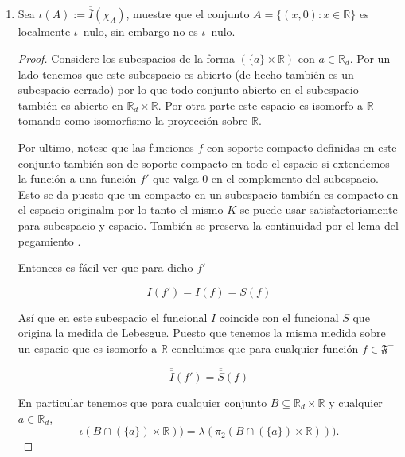 \documentclass[letter,twoside,12pt]{article}
\numberwithin{equation}{section}
\begin{document}
\begin{enumerate}[label = (\textbf{\arabic*.})]
\begin{enumerate}[label = (\textbf{\roman*.})]
\begin{proof}
Luego
\begin{eqnarray*} 
I(\alpha f+\beta g) &=& S(\sum_{i=1}^n \alpha f_{[x]} + \beta g_{[x]}) = S(\alpha\sum_{i=1}^n f_{[x]} + \beta \sum_{i=1}^n g_{[x]})
\\ &=& \alpha S(\sum_{i=1}^n f_{[x]}) + \beta S(\sum_{i=1}^n g_{[x]}) = \alpha I(f)+\beta I(g)
\end{eqnarray*}
\end{proof} por lo cual concluimos que $ I $ es un funcional lineal.

\item Sea $ \iota(A)  := \overline{\overline{I}}(\chi_A) $, muestre que el conjunto $ A = \{(x,0) : x \in \mathbb{R}\} $ es localmente $ \iota $–nulo, sin embargo no es $ \iota $–nulo.

\begin{proof}
Considere los subespacios  de la forma $(\{a\} \times \mathbb{R})$ con $ a \in \mathbb{{R}}_d $. Por un lado tenemos que este subespacio es abierto (de hecho también es un subespacio cerrado) por lo que todo conjunto abierto en el subespacio también es abierto en $\mathbb{R}_d \times \mathbb{R} $.
 Por otra parte este espacio es isomorfo a $\mathbb{R}$ tomando como isomorfismo la proyección sobre $ \mathbb{R} $.
 
 Por ultimo, notese que las funciones $f$ con soporte compacto definidas en este conjunto también son de soporte compacto en todo el espacio si extendemos la función a una función $f'$ que valga 0 en el complemento del subespacio. Esto se da puesto que un compacto en un subespacio también es compacto en el espacio originalm por lo tanto el mismo $K$ se puede usar satisfactoriamente para subespacio y espacio.  También se preserva la continuidad por el lema del pegamiento \cite[Teorema 18.3]{munkres}.
 
 Entonces es fácil ver que para dicho $f'$
 
 $$ I(f') = I(f) = S(f) $$
 
Así que en este subespacio el funcional $ I $ coincide con el funcional $S$ que origina la medida de Lebesgue. Puesto que tenemos la misma medida sobre un espacio que es isomorfo a $\mathbb{R}$ concluimos que para cualquier función $f \in \mathfrak{F}^+$

$$ \overline{\overline{I}}(f') = \overline{\overline{S}}(f) $$  

En particular tenemos que para cualquier conjunto $B \subseteq \mathbb{R}_d \times \mathbb{R} $ y cualquier $a \in \mathbb{R}_d$, 
$$\iota(B \cap (\{a\}) \times \mathbb{R})) = \lambda(\pi_2(B \cap (\{a\}) \times \mathbb{R}))). $$


\end{proof}
\end{enumerate}
\end{enumerate}
\end{document}
